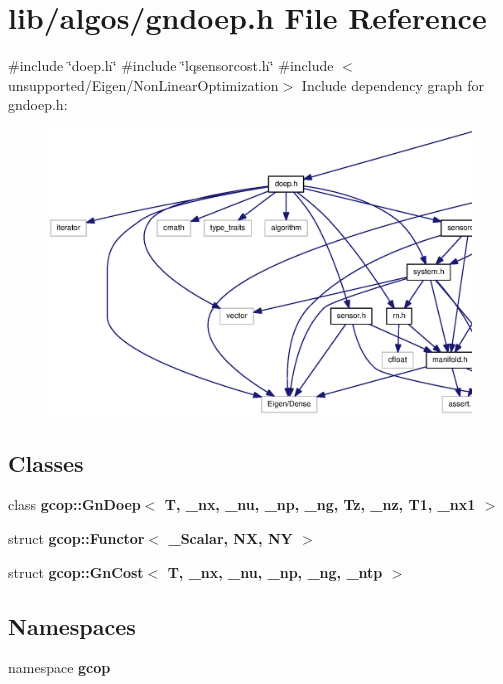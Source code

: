 \section{lib/algos/gndoep.h \-File \-Reference}
\label{gndoep_8h}
{\ttfamily \#include \char`\"{}doep.\-h\char`\"{}}\*
{\ttfamily \#include \char`\"{}lqsensorcost.\-h\char`\"{}}\*
{\ttfamily \#include $<$unsupported/\-Eigen/\-Non\-Linear\-Optimization$>$}\*
\-Include dependency graph for gndoep.\-h\-:
\nopagebreak
\begin{figure}[H]
\begin{center}
\leavevmode
\includegraphics[width=350pt]{gndoep_8h__incl}
\end{center}
\end{figure}
\subsection*{\-Classes}
\begin{DoxyCompactItemize}
\item 
class {\bf gcop\-::\-Gn\-Doep$<$ T, \-\_\-nx, \-\_\-nu, \-\_\-np, \-\_\-ng, Tz, \-\_\-nz, T1, \-\_\-nx1 $>$}
\item 
struct {\bf gcop\-::\-Functor$<$ \-\_\-\-Scalar, N\-X, N\-Y $>$}
\item 
struct {\bf gcop\-::\-Gn\-Cost$<$ T, \-\_\-nx, \-\_\-nu, \-\_\-np, \-\_\-ng, \-\_\-ntp $>$}
\end{DoxyCompactItemize}
\subsection*{\-Namespaces}
\begin{DoxyCompactItemize}
\item 
namespace {\bf gcop}
\end{DoxyCompactItemize}

